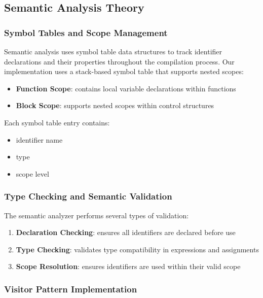 \documentclass[12pt, letterpaper]{article}
\begin{document}
\subsection*{Semantic Analysis Theory}

\subsubsection*{Symbol Tables and Scope Management}

Semantic analysis uses symbol table data structures to track identifier declarations and their properties throughout the compilation process. Our implementation uses a stack-based symbol table that supports nested scopes:

\begin{itemize}
    \item \textbf{Function Scope}: contains local variable declarations within functions
    \item \textbf{Block Scope}: supports nested scopes within control structures
\end{itemize}

Each symbol table entry contains:

\begin{itemize}
    \item identifier name
    \item type
    \item scope level
\end{itemize}

\subsubsection*{Type Checking and Semantic Validation}

The semantic analyzer performs several types of validation:

\begin{enumerate}
    \item \textbf{Declaration Checking}: ensures all identifiers are declared before use
    \item \textbf{Type Checking}: validates type compatibility in expressions and assignments
    \item \textbf{Scope Resolution}: ensures identifiers are used within their valid scope
\end{enumerate}

\subsubsection*{Visitor Pattern Implementation}
\end{document}
